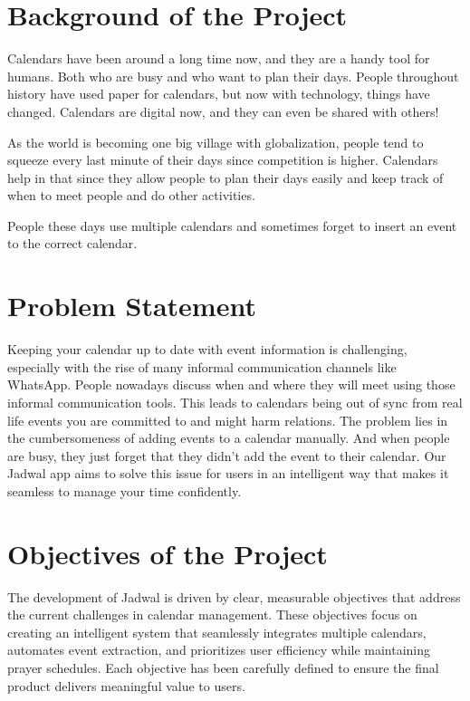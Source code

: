 \documentclass[12pt,a4paper]{report}
\begin{document}
\section{Background of the Project}

Calendars have been around a long time now, and they are a handy tool for humans. Both who are busy and who want to plan their days. People throughout history have used paper for calendars, but now with technology, things have changed. Calendars are digital now, and they can even be shared with others!

As the world is becoming one big village with globalization, people tend to squeeze every last minute of their days since competition is higher. Calendars help in that since they allow people to plan their days easily and keep track of when to meet people and do other activities.

People these days use multiple calendars and sometimes forget to insert an event to the correct calendar.

\section{Problem Statement}

Keeping your calendar up to date with event information is challenging, especially with the rise of many informal communication channels like WhatsApp. People nowadays discuss when and where they will meet using those informal communication tools. This leads to calendars being out of sync from real life events you are committed to and might harm relations. The problem lies in the cumbersomeness of adding events to a calendar manually. And when people are busy, they just forget that they didn't add the event to their calendar. Our Jadwal app aims to solve this issue for users in an intelligent way that makes it seamless to manage your time confidently.

\section{Objectives of the Project}

The development of Jadwal is driven by clear, measurable objectives that address the current challenges in calendar management. These objectives focus on creating an intelligent system that seamlessly integrates multiple calendars, automates event extraction, and prioritizes user efficiency while maintaining prayer schedules. Each objective has been carefully defined to ensure the final product delivers meaningful value to users.
\end{document}
